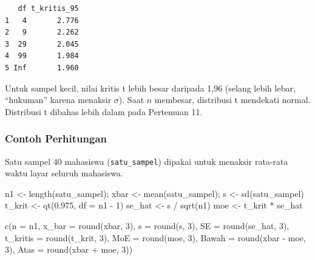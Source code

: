 \documentclass[
  indonesian,
  letterpaper,
]{book}
\newenvironment{Shaded}{\begin{snugshade}}{\end{snugshade}}
\newcommand{\AttributeTok}[1]{\textcolor[rgb]{0.40,0.45,0.13}{#1}}
\newcommand{\DecValTok}[1]{\textcolor[rgb]{0.68,0.00,0.00}{#1}}
\newcommand{\FloatTok}[1]{\textcolor[rgb]{0.68,0.00,0.00}{#1}}
\newcommand{\FunctionTok}[1]{\textcolor[rgb]{0.28,0.35,0.67}{#1}}
\newcommand{\NormalTok}[1]{\textcolor[rgb]{0.00,0.23,0.31}{#1}}
\newcommand{\OtherTok}[1]{\textcolor[rgb]{0.00,0.23,0.31}{#1}}
\newcommand{\SpecialCharTok}[1]{\textcolor[rgb]{0.37,0.37,0.37}{#1}}
\begin{document}
\begin{verbatim}
   df t_kritis_95
1   4       2.776
2   9       2.262
3  29       2.045
4  99       1.984
5 Inf       1.960
\end{verbatim}

Untuk sampel kecil, nilai kritis t lebih besar daripada 1,96 (selang
lebih lebar, ``hukuman'' karena menaksir \(\sigma\)). Saat \(n\)
membesar, distribusi t mendekati normal. Distribusi t dibahas lebih
dalam pada Pertemuan 11.

\subsubsection{\texorpdfstring{\textbf{Contoh
Perhitungan}}{Contoh Perhitungan}}\label{contoh-perhitungan}

Satu sampel 40 mahasiswa (\texttt{satu\_sampel}) dipakai untuk menaksir
rata-rata waktu layar seluruh mahasiswa.

\begin{Shaded}
\begin{Highlighting}[]
\NormalTok{n1 }\OtherTok{\textless{}{-}} \FunctionTok{length}\NormalTok{(satu\_sampel); xbar }\OtherTok{\textless{}{-}} \FunctionTok{mean}\NormalTok{(satu\_sampel); s }\OtherTok{\textless{}{-}} \FunctionTok{sd}\NormalTok{(satu\_sampel)}
\NormalTok{t\_krit }\OtherTok{\textless{}{-}} \FunctionTok{qt}\NormalTok{(}\FloatTok{0.975}\NormalTok{, }\AttributeTok{df =}\NormalTok{ n1 }\SpecialCharTok{{-}} \DecValTok{1}\NormalTok{)}
\NormalTok{se\_hat }\OtherTok{\textless{}{-}}\NormalTok{ s }\SpecialCharTok{/} \FunctionTok{sqrt}\NormalTok{(n1)}
\NormalTok{moe    }\OtherTok{\textless{}{-}}\NormalTok{ t\_krit }\SpecialCharTok{*}\NormalTok{ se\_hat}

\FunctionTok{c}\NormalTok{(}\AttributeTok{n =}\NormalTok{ n1, }\AttributeTok{x\_bar =} \FunctionTok{round}\NormalTok{(xbar, }\DecValTok{3}\NormalTok{), }\AttributeTok{s =} \FunctionTok{round}\NormalTok{(s, }\DecValTok{3}\NormalTok{), }\AttributeTok{SE =} \FunctionTok{round}\NormalTok{(se\_hat, }\DecValTok{3}\NormalTok{),}
  \AttributeTok{t\_kritis =} \FunctionTok{round}\NormalTok{(t\_krit, }\DecValTok{3}\NormalTok{), }\AttributeTok{MoE =} \FunctionTok{round}\NormalTok{(moe, }\DecValTok{3}\NormalTok{),}
  \AttributeTok{Bawah =} \FunctionTok{round}\NormalTok{(xbar }\SpecialCharTok{{-}}\NormalTok{ moe, }\DecValTok{3}\NormalTok{), }\AttributeTok{Atas =} \FunctionTok{round}\NormalTok{(xbar }\SpecialCharTok{+}\NormalTok{ moe, }\DecValTok{3}\NormalTok{))}
\end{Highlighting}
\end{Shaded}
\end{document}

